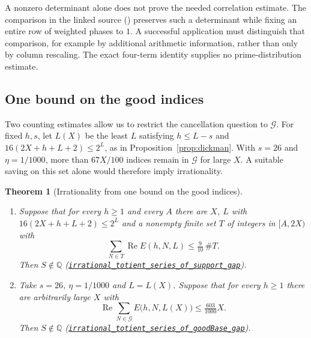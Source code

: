 \documentclass[11pt]{article}
\theoremstyle{plain}
\newtheorem{thm}{Theorem}[section]
\theoremstyle{definition}
\theoremstyle{remark}
\newcommand{\lean}[2]{\leanlink{#2}}
\newcommand{\Q}{\mathbb{Q}}
\begin{document}
A nonzero determinant alone does not prove the needed correlation
estimate. The comparison in the linked source
(\lean{Erdos249257.ResidualGaugeObstruction.locked_reconstruction_preserves_nonzero_minor}{ResidualGaugeObstruction.lean:94})
preserves such a determinant
while fixing an entire row of weighted phases to $1$. A successful
application must distinguish that comparison, for example by additional
arithmetic information, rather than only by column rescaling. The exact
four-term identity supplies no prime-distribution estimate.

\subsection{One bound on the good indices}\label{sub:goodbasegap}

Two counting estimates allow us to restrict the cancellation question
to $\mathcal G$. For fixed $h,s$, let $L(X)$ be the least $L$ satisfying
$h\le L-s$ and $16(2X+h+L+2)\le2^L$, as in
Proposition~\ref{prop:dickman}. With $s=26$ and $\eta=1/1000$, more
than $67X/100$ indices remain in $\mathcal G$ for large $X$.
A suitable saving on this set alone would therefore imply irrationality.

\begin{thm}[Irrationality from one bound on the good indices]
\label{thm:goodbasegap}
\begin{enumerate}[label=(\alph*),leftmargin=*]
\item Suppose that for every $h\ge1$ and every $A$ there are $X$, $L$ with
  $16(2X+h+L+2)\le2^L$ and a nonempty finite set $T$ of integers in
  $[A,2X)$ with
  \[
   \sum_{N\in T}\operatorname{Re}E(h,N,L)\le\tfrac{9}{10}\,\#T.
  \]
  Then $S\notin\Q$
  (\href{https://github.com/wcook04/plectis-erdos/blob/24edbddbe2bd68e920327a701aad0b9dd0d69675/lean/ErdosProblems/ArgumentGraph/Results/Erdos249Endpoint.lean\#L44}{\texttt{irrational\_totient\_series\_of\_support\_gap}}).
\item Take $s=26$, $\eta=1/1000$ and $L=L(X)$. Suppose that for every
  $h\ge1$ there are arbitrarily large $X$ with
  \[
   \operatorname{Re}\sum_{N\in\mathcal G}E\bigl(h,N,L(X)\bigr)
   \le\tfrac{603}{1000}X.
  \]
  Then $S\notin\Q$
  (\href{https://github.com/wcook04/plectis-erdos/blob/24edbddbe2bd68e920327a701aad0b9dd0d69675/lean/ErdosProblems/ArgumentGraph/Results/Erdos249Endpoint.lean\#L100}{\texttt{irrational\_totient\_series\_of\_goodBase\_gap}}).
\end{enumerate}
\end{thm}
\end{document}
